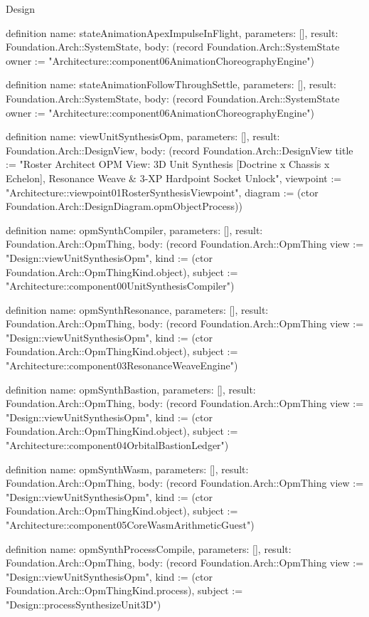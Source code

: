 \begin{lexlean}{Design}
\begin{semanticmodule}
definition{
  name: stateAnimationApexImpulseInFlight,
  parameters: [],
  result: Foundation.Arch::SystemState,
  body: (record Foundation.Arch::SystemState {owner := "Architecture::component06AnimationChoreographyEngine"})
}

definition{
  name: stateAnimationFollowThroughSettle,
  parameters: [],
  result: Foundation.Arch::SystemState,
  body: (record Foundation.Arch::SystemState {owner := "Architecture::component06AnimationChoreographyEngine"})
}

definition{
  name: viewUnitSynthesisOpm,
  parameters: [],
  result: Foundation.Arch::DesignView,
  body: (record Foundation.Arch::DesignView {title := "Roster Architect OPM View: 3D Unit Synthesis [Doctrine x Chassis x Echelon], Resonance Weave & 3-XP Hardpoint Socket Unlock", viewpoint := "Architecture::viewpoint01RosterSynthesisViewpoint", diagram := (ctor Foundation.Arch::DesignDiagram.opmObjectProcess)})
}

definition{
  name: opmSynthCompiler,
  parameters: [],
  result: Foundation.Arch::OpmThing,
  body: (record Foundation.Arch::OpmThing {view := "Design::viewUnitSynthesisOpm", kind := (ctor Foundation.Arch::OpmThingKind.object), subject := "Architecture::component00UnitSynthesisCompiler"})
}

definition{
  name: opmSynthResonance,
  parameters: [],
  result: Foundation.Arch::OpmThing,
  body: (record Foundation.Arch::OpmThing {view := "Design::viewUnitSynthesisOpm", kind := (ctor Foundation.Arch::OpmThingKind.object), subject := "Architecture::component03ResonanceWeaveEngine"})
}

definition{
  name: opmSynthBastion,
  parameters: [],
  result: Foundation.Arch::OpmThing,
  body: (record Foundation.Arch::OpmThing {view := "Design::viewUnitSynthesisOpm", kind := (ctor Foundation.Arch::OpmThingKind.object), subject := "Architecture::component04OrbitalBastionLedger"})
}

definition{
  name: opmSynthWasm,
  parameters: [],
  result: Foundation.Arch::OpmThing,
  body: (record Foundation.Arch::OpmThing {view := "Design::viewUnitSynthesisOpm", kind := (ctor Foundation.Arch::OpmThingKind.object), subject := "Architecture::component05CoreWasmArithmeticGuest"})
}

definition{
  name: opmSynthProcessCompile,
  parameters: [],
  result: Foundation.Arch::OpmThing,
  body: (record Foundation.Arch::OpmThing {view := "Design::viewUnitSynthesisOpm", kind := (ctor Foundation.Arch::OpmThingKind.process), subject := "Design::processSynthesizeUnit3D"})
}


\end{semanticmodule}
\end{lexlean}
